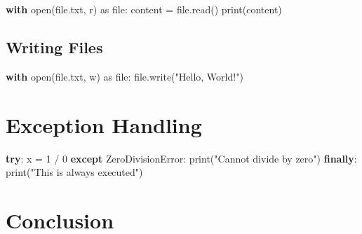 \documentclass[
  letterpaper,
  DIV=11,
  numbers=noendperiod]{scrreprt}
\newenvironment{Shaded}{\begin{snugshade}}{\end{snugshade}}
\newcommand{\BuiltInTok}[1]{\textcolor[rgb]{0.00,0.23,0.31}{#1}}
\newcommand{\ControlFlowTok}[1]{\textcolor[rgb]{0.00,0.23,0.31}{\textbf{#1}}}
\newcommand{\DecValTok}[1]{\textcolor[rgb]{0.68,0.00,0.00}{#1}}
\newcommand{\ImportTok}[1]{\textcolor[rgb]{0.00,0.46,0.62}{#1}}
\newcommand{\NormalTok}[1]{\textcolor[rgb]{0.00,0.23,0.31}{#1}}
\newcommand{\OperatorTok}[1]{\textcolor[rgb]{0.37,0.37,0.37}{#1}}
\newcommand{\PreprocessorTok}[1]{\textcolor[rgb]{0.68,0.00,0.00}{#1}}
\newcommand{\StringTok}[1]{\textcolor[rgb]{0.13,0.47,0.30}{#1}}
\begin{document}
\begin{Shaded}
\begin{Highlighting}[]
\ControlFlowTok{with} \BuiltInTok{open}\NormalTok{(}\StringTok{\textquotesingle{}file.txt\textquotesingle{}}\NormalTok{, }\StringTok{\textquotesingle{}r\textquotesingle{}}\NormalTok{) }\ImportTok{as} \BuiltInTok{file}\NormalTok{:}
\NormalTok{    content }\OperatorTok{=} \BuiltInTok{file}\NormalTok{.read()}
    \BuiltInTok{print}\NormalTok{(content)}
\end{Highlighting}
\end{Shaded}

\subsection{Writing Files}\label{writing-files}

\begin{Shaded}
\begin{Highlighting}[]
\ControlFlowTok{with} \BuiltInTok{open}\NormalTok{(}\StringTok{\textquotesingle{}file.txt\textquotesingle{}}\NormalTok{, }\StringTok{\textquotesingle{}w\textquotesingle{}}\NormalTok{) }\ImportTok{as} \BuiltInTok{file}\NormalTok{:}
    \BuiltInTok{file}\NormalTok{.write(}\StringTok{"Hello, World!"}\NormalTok{)}
\end{Highlighting}
\end{Shaded}

\section{Exception Handling}\label{exception-handling}

\begin{Shaded}
\begin{Highlighting}[]
\ControlFlowTok{try}\NormalTok{:}
\NormalTok{    x }\OperatorTok{=} \DecValTok{1} \OperatorTok{/} \DecValTok{0}
\ControlFlowTok{except} \PreprocessorTok{ZeroDivisionError}\NormalTok{:}
    \BuiltInTok{print}\NormalTok{(}\StringTok{"Cannot divide by zero"}\NormalTok{)}
\ControlFlowTok{finally}\NormalTok{:}
    \BuiltInTok{print}\NormalTok{(}\StringTok{"This is always executed"}\NormalTok{)}
\end{Highlighting}
\end{Shaded}

\section{Conclusion}\label{conclusion-1}
\end{document}
